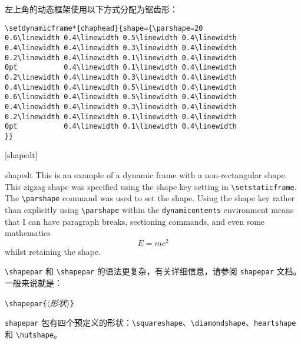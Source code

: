 \documentclass[a4paper]{book}%
\newcommand{\sty}[1]{\texttt{#1}}
\newcommand{\meta}[1]{\textnormal{\ensuremath{\langle}\makebox[0pt][l]{}\emph{#1}\makebox[0pt][l]{}\ensuremath{\rangle}}}
\newcommand{\cmd}[1]{\texttt{#1}}
\begin{document}
左上角的动态框架使用以下方式分配为锯齿形：
\begin{lstlisting}[backgroundcolor=\color{white}]
\setdynamicframe*{chaphead}{shape={\parshape=20
0.6\linewidth 0.4\linewidth 0.5\linewidth 0.4\linewidth
0.4\linewidth 0.4\linewidth 0.3\linewidth 0.4\linewidth
0.2\linewidth 0.4\linewidth 0.1\linewidth 0.4\linewidth
0pt           0.4\linewidth 0.1\linewidth 0.4\linewidth
0.2\linewidth 0.4\linewidth 0.3\linewidth 0.4\linewidth
0.4\linewidth 0.4\linewidth 0.5\linewidth 0.4\linewidth
0.6\linewidth 0.4\linewidth 0.5\linewidth 0.4\linewidth
0.4\linewidth 0.4\linewidth 0.3\linewidth 0.4\linewidth
0.2\linewidth 0.4\linewidth 0.1\linewidth 0.4\linewidth
0pt           0.4\linewidth 0.1\linewidth 0.4\linewidth
}}
\end{lstlisting}
[shapedt]
\begin{dynamiccontents*}{shapedt}
    This is an example of a dynamic frame with a non-rectangular shape. This zigzag shape was specified using the shape key setting in \cmd{\textbackslash{setstaticframe}}. The \cmd{\textbackslash{parshape}} command was used to set the shape. Using the shape key rather than explicitly using \cmd{\textbackslash{parshape}} within the \cmd{dynamicontents} environment means that I can have paragraph breaks, sectioning commands, and even some mathematics
    \begin{equation}
        E = mc^2
    \end{equation}
    whilst retaining the shape.
\end{dynamiccontents*}

\verb|\shapepar| 和 \verb|\shapepar| 的语法更复杂，有关详细信息，请参阅 \sty{shapepar} 文档。一般来说就是：
\begin{mdframed}[backgroundcolor=white]
    \verb|\shapepar{|\meta{形状}\verb|}|
\end{mdframed}
\sty{shapepar} 包有四个预定义的形状：\verb|\squareshape|、\verb|\diamondshape|、\verb|heartshape| 和 \verb|\nutshape|。
\end{document}
